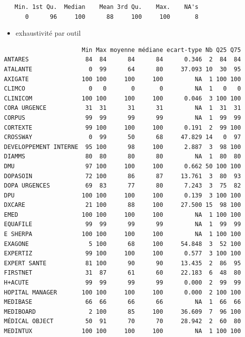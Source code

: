 \documentclass[]{article}
\begin{document}
\begin{verbatim}
   Min. 1st Qu.  Median    Mean 3rd Qu.    Max.    NA's 
      0      96     100      88     100     100       8 
\end{verbatim}

\begin{itemize}
\itemsep1pt\parskip0pt
\item
  exhaustivité par outil
\end{itemize}

\begin{verbatim}
                      Min Max moyenne médiane ecart-type Nb Q25 Q75
ANTARES                84  84      84      84      0.346  2  84  84
ATALANTE                0  99      64      80     37.093 10  30  95
AXIGATE               100 100     100     100         NA  1 100 100
CLIMCO                  0   0       0       0         NA  1   0   0
CLINICOM              100 100     100     100      0.046  3 100 100
CORA URGENCE           31  31      31      31         NA  1  31  31
CORPUS                 99  99      99      99         NA  1  99  99
CORTEXTE               99 100     100     100      0.191  2  99 100
CROSSWAY                0  99      50      68     47.829 14   0  97
DEVELOPPEMENT INTERNE  95 100      98     100      2.887  3  98 100
DIAMMS                 80  80      80      80         NA  1  80  80
DMU                    97 100     100     100      0.662 50 100 100
DOPASOIN               72 100      86      87     13.761  3  80  93
DOPA URGENCES          69  83      77      80      7.243  3  75  82
DPU                   100 100     100     100      0.139  3 100 100
DXCARE                 21 100      88     100     27.500 15  98 100
EMED                  100 100     100     100         NA  1 100 100
EQUAFILE               99  99      99      99         NA  1  99  99
E SHERPA              100 100     100     100         NA  1 100 100
EXAGONE                 5 100      68     100     54.848  3  52 100
EXPERTIZ               99 100     100     100      0.577  3 100 100
EXPERT SANTE           81 100      90      90     13.435  2  86  95
FIRSTNET               31  87      61      60     22.183  6  48  80
H+ACUTE                99  99      99      99      0.000  2  99  99
HOPITAL MANAGER       100 100     100     100      0.000  2 100 100
MEDIBASE               66  66      66      66         NA  1  66  66
MEDIBOARD               2 100      85     100     36.609  7  96 100
MÉDICAL OBJECT         50  91      70      70     28.942  2  60  80
MEDINTUX              100 100     100     100         NA  1 100 100

\end{verbatim}
\end{document}
